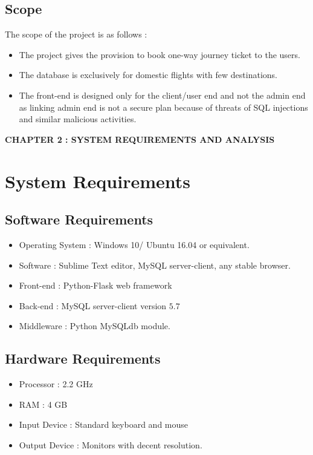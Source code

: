 \documentclass[hidelinks=true]{article}
\begin{document}
\subsection{Scope}

The scope of the project is as follows : 
\begin{itemize}
\item {The project gives the provision to book one-way journey ticket to the users.}
\item {The database is exclusively for domestic flights with few destinations.}
\item{The front-end is designed only for the client/user end and not the admin end as linking admin end is not a secure plan because of threats of SQL injections and similar malicious activities.}
\end{itemize}

\pagebreak
\begin{center}
\vspace*{\fill}
\LARGE{\textbf{CHAPTER 2 : SYSTEM REQUIREMENTS AND ANALYSIS}}
\vspace*{\fill}
\end{center}

\pagebreak

\section{System Requirements}
\subsection{Software Requirements}
\begin{itemize}
\item {Operating System : Windows 10/ Ubuntu 16.04 or equivalent.}
\item{Software : Sublime Text editor, MySQL server-client, any stable browser.}
\item {Front-end : Python-Flask web framework}
\item {Back-end : MySQL server-client version $5.7$}
\item {Middleware : Python MySQLdb module. }
\end{itemize}


\subsection{Hardware Requirements}
\begin{itemize}
\item Processor : 2.2 GHz
\item RAM : 4 GB
\item Input Device : Standard keyboard and mouse
\item Output Device : Monitors with decent resolution.
\end{itemize}
\end{document}
